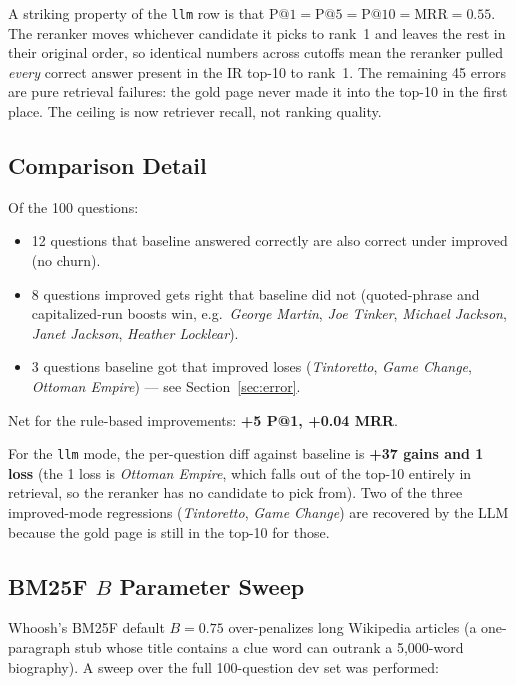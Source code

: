 \documentclass[11pt]{article}
\begin{document}
A striking property of the \texttt{llm} row is that
$\text{P@1} = \text{P@5} = \text{P@10} = \text{MRR} = 0.55$. The reranker
moves whichever candidate it picks to rank~1 and leaves the rest in
their original order, so identical numbers across cutoffs mean the
reranker pulled \emph{every} correct answer present in the IR top-10 to
rank~1. The remaining 45 errors are pure retrieval failures: the gold
page never made it into the top-10 in the first place. The ceiling is
now retriever recall, not ranking quality.

\subsection{Comparison Detail}

Of the 100 questions:

\begin{itemize}
  \item 12 questions that baseline answered correctly are also correct
        under improved (no churn).
  \item 8 questions improved gets right that baseline did not
        (quoted-phrase and capitalized-run boosts win, e.g.\
        \emph{George Martin}, \emph{Joe Tinker}, \emph{Michael Jackson},
        \emph{Janet Jackson}, \emph{Heather Locklear}).
  \item 3 questions baseline got that improved loses (\emph{Tintoretto},
        \emph{Game Change}, \emph{Ottoman Empire}) --- see
        Section~\ref{sec:error}.
\end{itemize}

Net for the rule-based improvements: \textbf{+5 P@1, +0.04 MRR}.

For the \texttt{llm} mode, the per-question diff against baseline is
\textbf{+37 gains and 1 loss} (the 1 loss is \emph{Ottoman Empire}, which
falls out of the top-10 entirely in retrieval, so the reranker has no
candidate to pick from). Two of the three improved-mode regressions
(\emph{Tintoretto}, \emph{Game Change}) are recovered by the LLM
because the gold page is still in the top-10 for those.

\subsection{BM25F \texorpdfstring{$B$}{B} Parameter Sweep}

Whoosh's BM25F default $B = 0.75$ over-penalizes long Wikipedia articles (a
one-paragraph stub whose title contains a clue word can outrank a 5,000-word
biography). A sweep over the full 100-question dev set was performed:
\end{document}
